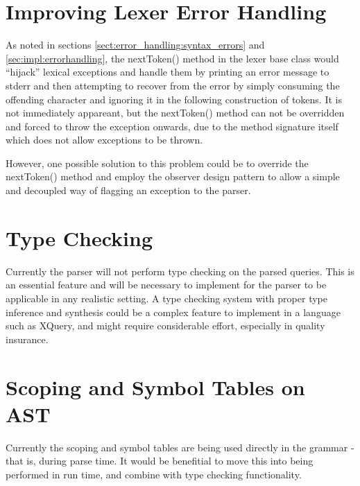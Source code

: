 \section{Improving Lexer Error Handling}
As noted in sections \ref{sect:error_handling:syntax_errors} and
\ref{sec:impl:errorhandling}, the nextToken() method in the lexer base class
would ``hijack'' lexical exceptions and handle them by printing an error message
to stderr and then attempting to recover from the error by simply consuming the
offending character and ignoring it in the following construction of tokens. It is 
not immediately appareant, but the nextToken() method can not be overridden and
forced to throw the exception onwards, due to the method signature itself which
does not allow exceptions to be thrown. 

However, one possible solution to this problem could be to override the
nextToken() method and employ the observer design
pattern to allow a
simple and decoupled way of flagging an exception to the parser.

\section{Type Checking}
Currently the parser will not perform type checking on the parsed queries. This
is an essential feature and will be necessary to implement for the parser to be
applicable in any realistic setting. A type checking system with proper type
inference and synthesis could be a complex feature to implement in a language
such as XQuery, and might require considerable effort, especially in quality
insurance. 

\section{Scoping and Symbol Tables on AST}
Currently the scoping and symbol tables are being used directly in the grammar -
that is, during parse time. It would be benefitial to move this into being
performed in run time, and combine with type checking functionality.
